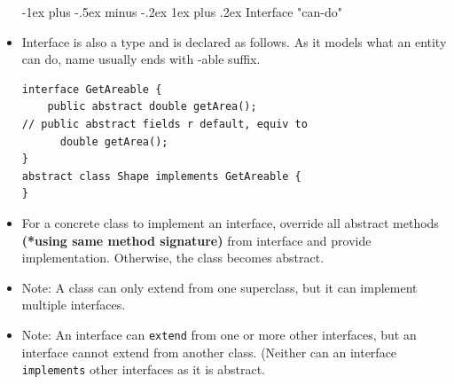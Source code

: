\documentclass[12pt, landscape]{article}
\makeatletter
\newcommand{\code}[1]{\colorbox{gray!25!}{\lstinline|#1|}}
\renewcommand{\subsubsection}{\@startsection{subsubsection}{3}{0.1mm}%
                                {-1ex plus -.5ex minus -.2ex}%
                                {1ex plus .2ex}%
                                {\normalfont\small\bfseries}}
\makeatother
\begin{document}
\begin{multicols*}{3}
\begin{itemize}
\subsubsection{Interface "can-do"}
	\item Interface is also a type and is declared as follows. As it models what an entity can do, name usually ends with -able suffix.
\begin{lstlisting}
interface GetAreable {
  	public abstract double getArea();
// public abstract fields r default, equiv to
	  double getArea();
}
abstract class Shape implements GetAreable { 
}
\end{lstlisting}
	\item For a concrete class to implement an interface, override all abstract methods \textbf{(*using same method signature)} from interface and provide implementation. Otherwise, the class becomes abstract.
	\item Note: A class can only extend from one superclass, but it can implement multiple interfaces. 
	\item Note: An interface can \code{extend} from one or more other interfaces, but an interface cannot extend from another class. (Neither can an interface \code{implements} other interfaces as it is abstract.
\end{itemize}


\end{multicols*}
\end{document}
